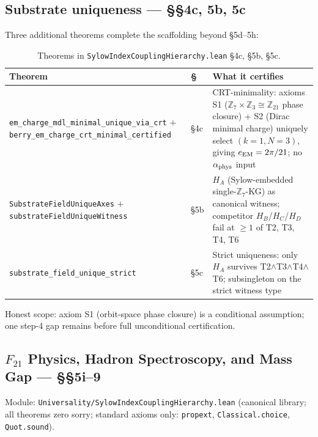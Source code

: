 \documentclass[11pt,a4paper]{article}
\theoremstyle{definition}
\begin{document}
\subsection{Substrate uniqueness — §§4c, 5b, 5c}\label{subsec:substrate-uniqueness}

Three additional theorems complete the scaffolding beyond §5d–5h:

\begin{table}[h]
\centering\small
\begin{tabular}{@{}p{5cm}p{1.2cm}p{8.8cm}@{}}
\toprule
Theorem & § & What it certifies \\
\midrule
\texttt{em\_charge\_\allowbreak mdl\_minimal\_\allowbreak unique\_via\_crt} $+$
\texttt{berry\_\allowbreak em\_charge\_\allowbreak crt\_minimal\_\allowbreak certified} & §4c &
  CRT-minimality: axioms S1 ($\mathbb{Z}_7 \times \mathbb{Z}_3 \cong \mathbb{Z}_{21}$
  phase closure) + S2 (Dirac minimal charge) uniquely select $(k=1, N=3)$,
  giving $e_{\rm EM} = 2\pi/21$; no $\alpha_{\rm phys}$ input \\[2pt]
\texttt{Substrate\allowbreak FieldUnique\allowbreak Axes} $+$
\texttt{substrate\allowbreak FieldUnique\allowbreak Witness} & §5b &
  $H_A$ (Sylow-embedded single-$\mathbb{Z}_7$-KG) as canonical witness;
  competitor $H_B$/$H_C$/$H_D$ fail at $\ge 1$ of T2, T3, T4, T6 \\[2pt]
\texttt{substrate\_\allowbreak field\_\allowbreak unique\_strict} & §5c &
  Strict uniqueness: only $H_A$ survives T2$\wedge$T3$\wedge$T4$\wedge$T6;
  subsingleton on the strict witness type \\
\bottomrule
\end{tabular}
\caption{Theorems in \texttt{SylowIndexCouplingHierarchy.lean} §4c, §5b, §5c.}
\label{tab:sylow-substrate}
\end{table}

Honest scope: axiom S1 (orbit-space phase closure) is a conditional
assumption; one step-4 gap remains before full unconditional certification.

\subsection{$F_{21}$ Physics, Hadron Spectroscopy,
  and Mass Gap — §§5i–9}\label{subsec:f21-physics}

Module: \texttt{Universality/SylowIndexCouplingHierarchy.lean}
(canonical library; all theorems zero sorry; standard axioms only:
\texttt{propext}, \texttt{Classical.choice}, \texttt{Quot.sound}).
\end{document}
